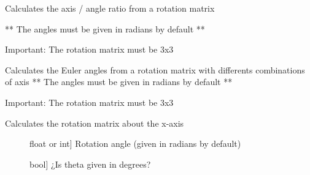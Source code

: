 \documentclass[letterpaper,10pt,english]{sphinxmanual}
\begin{document}

\begin{fulllineitems}
\label{\detokenize{_src/transformations:rkd.transformations.rot2axa}}
Calculates the axis / angle ratio from a rotation matrix

** The angles must be given in radians by default **

Important: The rotation matrix must be 3x3

\end{fulllineitems}


\begin{fulllineitems}
\label{\detokenize{_src/transformations:rkd.transformations.rot2eul}}
Calculates the Euler angles from a rotation matrix with differents combinations of axis
** The angles must be given in radians by default **

Important: The rotation matrix must be 3x3

\end{fulllineitems}


\begin{fulllineitems}
\label{\detokenize{_src/transformations:rkd.transformations.rotx}}
Calculates the rotation matrix about the x-axis
\begin{description}
\item[{}] \leavevmode{[}float or int{]}
Rotation angle (given in radians by default)

\item[{}] \leavevmode{[}bool{]}
¿Is theta given in degrees?

\end{description}

\end{fulllineitems}

\end{document}
